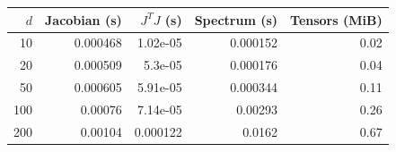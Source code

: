 \begin{tabular}{rrrrr}
\toprule
$d$ & Jacobian (s) & $J^TJ$ (s) & Spectrum (s) & Tensors (MiB)\\
\midrule
10 & 0.000468 & 1.02e-05 & 0.000152 & 0.02\\
20 & 0.000509 & 5.3e-05 & 0.000176 & 0.04\\
50 & 0.000605 & 5.91e-05 & 0.000344 & 0.11\\
100 & 0.00076 & 7.14e-05 & 0.00293 & 0.26\\
200 & 0.00104 & 0.000122 & 0.0162 & 0.67\\
\bottomrule
\end{tabular}
